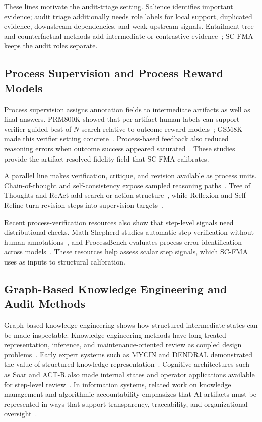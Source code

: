 \documentclass[pdflatex,sn-mathphys-num,iicol]{sn-jnl}
\begin{document}
These lines motivate the audit-triage setting. Salience identifies important evidence; audit triage additionally needs role labels for local support, duplicated evidence, downstream dependencies, and weak upstream signals. Entailment-tree and counterfactual methods add intermediate or contrastive evidence~\cite{dalvi2021entailmenttrees,wijekoon2023counterfactual}; SC-FMA keeps the audit roles separate.

\subsection{Process Supervision and Process Reward Models}

Process supervision assigns annotation fields to intermediate artifacts as well as final answers. PRM800K showed that per-artifact human labels can support verifier-guided best-of-$N$ search relative to outcome reward models~\cite{lightman2023verify}; GSM8K made this verifier setting concrete~\cite{cobbe2021training}. Process-based feedback also reduced reasoning errors when outcome success appeared saturated~\cite{uesato2022solving}. These studies provide the artifact-resolved fidelity field that SC-FMA calibrates.

A parallel line makes verification, critique, and revision available as process units. Chain-of-thought and self-consistency expose sampled reasoning paths~\cite{wei2022cot,wang2022selfconsistency}. Tree of Thoughts and ReAct add search or action structure~\cite{yao2023tot,yao2022react}, while Reflexion and Self-Refine turn revision steps into supervision targets~\cite{shinn2023reflexion,madaan2023selfrefine}.

Recent process-verification resources also show that step-level signals need distributional checks. Math-Shepherd studies automatic step verification without human annotations~\cite{wang2024mathshepherd}, and ProcessBench evaluates process-error identification across models~\cite{zheng2024processbench}. These resources help assess scalar step signals, which SC-FMA uses as inputs to structural calibration.

\subsection{Graph-Based Knowledge Engineering and Audit Methods}

Graph-based knowledge engineering shows how structured intermediate states can be made inspectable. Knowledge-engineering methods have long treated representation, inference, and maintenance-oriented review as coupled design problems~\cite{studer1998knowledge}. Early expert systems such as MYCIN and DENDRAL demonstrated the value of structured knowledge representation~\cite{buchanan1984mycin,lindsay1980dendral}. Cognitive architectures such as Soar and ACT-R also made internal states and operator applications available for step-level review~\cite{laird2012soar,anderson2004actr}. In information systems, related work on knowledge management and algorithmic accountability emphasizes that AI artifacts must be represented in ways that support transparency, traceability, and organizational oversight~\cite{dwivedi2021artificial,raji2020closing}.
\end{document}
